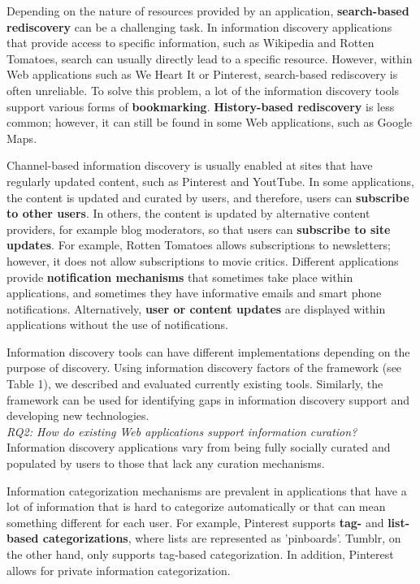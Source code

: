 \documentclass{casconpaper}
\begin{document}
{Depending on the nature of resources provided by an application, \textbf{search-based rediscovery} can be a challenging task. In information discovery applications that provide access to specific information, such as Wikipedia and Rotten Tomatoes, search can usually directly lead to a specific resource. However, within Web applications such as We Heart It or Pinterest, search-based rediscovery is often unreliable. To solve this problem, a lot of the information discovery tools support various forms of \textbf{bookmarking}. \textbf{History-based rediscovery} is less common; however, it  can still be found in some Web applications, such as Google Maps.

Channel-based information discovery is usually enabled at sites that have regularly updated content, such as Pinterest and YoutTube. In some applications, the content is updated and curated by users, and therefore, users can \textbf{subscribe to other users}. In others, the content is updated by alternative content providers, for example blog moderators, so that users can \textbf{subscribe to site updates}. For example, Rotten Tomatoes allows subscriptions to newsletters; however, it does not allow subscriptions to movie critics. Different applications provide \textbf{notification mechanisms} that sometimes take place within applications, and sometimes they have informative emails and smart phone notifications. Alternatively, \textbf{user or content updates} are displayed within applications without the use of notifications.   

Information discovery tools can have different implementations depending on the purpose of discovery. Using information discovery factors of the framework (see Table 1), we described and evaluated currently existing tools. Similarly, the framework can be used for identifying gaps in information discovery support and developing new technologies.   \\

\emph{RQ2: How do existing Web applications support information curation?}\\

Information discovery applications vary from being fully socially curated and populated by users to those that lack any curation mechanisms. 

Information categorization mechanisms are prevalent in applications that have a lot of information that is hard to categorize automatically or that can mean something different for each user. For example, Pinterest supports \textbf{tag-} and \textbf{list-based categorizations}, where lists are represented as 'pinboards'. Tumblr, on the other hand, only supports tag-based categorization. In addition, Pinterest allows for private information categorization.

}
\end{document}
